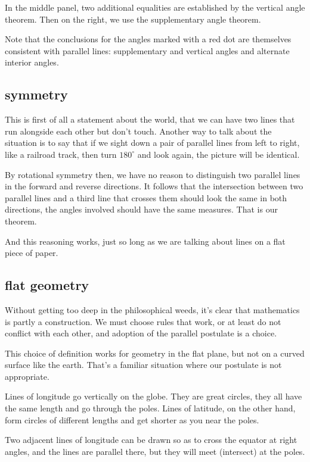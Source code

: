 \documentclass[11pt, oneside]{article}
\begin{document}
In the middle panel, two additional equalities are established by the vertical angle theorem.  Then on the right, we use the supplementary angle theorem.

Note that the conclusions for the angles marked with a red dot are themselves consistent with parallel lines:  supplementary and vertical angles and alternate interior angles.

\subsection*{symmetry}

This is first of all a statement about the world, that we can have two lines that run alongside each other but don't touch.  Another way to talk about the situation is to say that if we sight down a pair of parallel lines from left to right, like a railroad track, then turn $180^{\circ}$ and look again, the picture will be identical.

By rotational symmetry then, we have no reason to distinguish two parallel lines in the forward and reverse directions.  It follows that the intersection between two parallel lines and a third line that crosses them should look the same in both directions, the angles involved should have the same measures.  That is our theorem.  

And this reasoning works, just so long as we are talking about lines on a flat piece of paper.

\subsection*{flat geometry}

Without getting too deep in the philosophical weeds, it's clear that mathematics is partly a construction.  We must choose rules that work, or at least do not conflict with each other, and adoption of the parallel postulate is a choice.  

This choice of definition works for geometry in the flat plane, but not on a curved surface like the earth.  That's a familiar situation where our postulate is not appropriate.

Lines of longitude go vertically on the globe.  They are great circles, they all have the same length and go through the poles.  Lines of latitude, on the other hand, form circles of different lengths and get shorter as you near the poles.

Two adjacent lines of longitude can be drawn so as to cross the equator at right angles, and the lines are parallel there, but they will meet (intersect) at the poles.  
\end{document}
